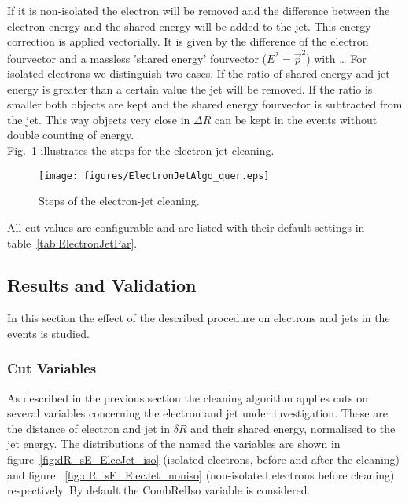 \documentclass{cmspaper}
\begin{document}
If it is non-isolated the electron will be removed and the difference between
the electron energy and the shared energy will be added to the jet. This energy
correction is applied vectorially. It is given by the difference of the electron
fourvector and a massless 'shared energy' fourvector ($E^2=\vec{p}^2$)
{\color{red}with \ldots}
For isolated electrons we distinguish two cases. If the ratio of shared energy
and jet energy is greater than a certain value the jet will be removed. If the
ratio is smaller both objects are kept and the shared energy fourvector is subtracted from
the jet. This way objects very close in $\Delta R$ can be kept in the events
without double counting of energy.\\

Fig.~\ref{fig:EJCleaning} illustrates the steps for the electron-jet cleaning.\\
\begin{figure}[hbtp]
  \begin{center}
    \texttt{[image: figures/ElectronJetAlgo\_quer.eps]}
    \caption{Steps of the electron-jet cleaning.}
    \label{fig:EJCleaning}
  \end{center}
\end{figure}

All cut values are configurable and are listed with their default settings in
table~\ref{tab:ElectronJetPar}.

\subsection{Results and Validation}
In this section the effect of the described procedure on electrons and jets in
the events is studied. 

\subsubsection{Cut Variables}
As described in the previous section the cleaning algorithm applies cuts on
several variables concerning the electron and jet under investigation. These are
the distance of electron and jet in $\delta R$ and their shared energy,
normalised to the jet energy. The distributions of the named the variables are shown
in figure~\ref{fig:dR_sE_ElecJet_iso} (isolated electrons, before and after the
cleaning) and figure ~\ref{fig:dR_sE_ElecJet_noniso} (non-isolated electrons
before cleaning) respectively. By default the CombRelIso variable is considered.
\end{document}
